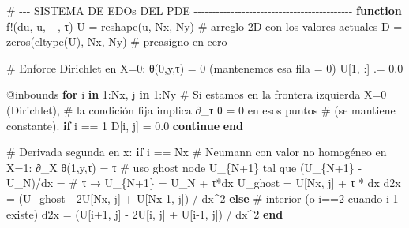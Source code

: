 \documentclass[
  spanish,
  us-letterpaper,
]{scrreprt}
\newenvironment{Shaded}{\begin{snugshade}}{\end{snugshade}}
\newcommand{\CommentTok}[1]{\textcolor[rgb]{0.37,0.37,0.37}{#1}}
\newcommand{\ControlFlowTok}[1]{\textcolor[rgb]{0.00,0.23,0.31}{\textbf{#1}}}
\newcommand{\FloatTok}[1]{\textcolor[rgb]{0.68,0.00,0.00}{#1}}
\newcommand{\FunctionTok}[1]{\textcolor[rgb]{0.28,0.35,0.67}{#1}}
\newcommand{\KeywordTok}[1]{\textcolor[rgb]{0.00,0.23,0.31}{\textbf{#1}}}
\newcommand{\NormalTok}[1]{\textcolor[rgb]{0.00,0.23,0.31}{#1}}
\newcommand{\OperatorTok}[1]{\textcolor[rgb]{0.37,0.37,0.37}{#1}}
\newcommand{\PreprocessorTok}[1]{\textcolor[rgb]{0.68,0.00,0.00}{#1}}
\theoremstyle{definition}
\theoremstyle{plain}
\theoremstyle{remark}
\begin{document}
\begin{Shaded}
\begin{Highlighting}[]
\CommentTok{\# {-}{-}{-} SISTEMA DE EDOs DEL PDE {-}{-}{-}{-}{-}{-}{-}{-}{-}{-}{-}{-}{-}{-}{-}{-}{-}{-}{-}{-}{-}{-}{-}{-}{-}{-}{-}{-}{-}{-}{-}{-}{-}{-}{-}{-}{-}{-}{-}{-}{-}{-}{-}}
\KeywordTok{function} \FunctionTok{f!}\NormalTok{(du, u, \_, τ)}
\NormalTok{    U }\OperatorTok{=} \FunctionTok{reshape}\NormalTok{(u, Nx, Ny)          }\CommentTok{\# arreglo 2D con los valores actuales}
\NormalTok{    D }\OperatorTok{=} \FunctionTok{zeros}\NormalTok{(}\FunctionTok{eltype}\NormalTok{(U), Nx, Ny)    }\CommentTok{\# preasigno en cero}

    \CommentTok{\# Enforce Dirichlet en X=0: θ(0,y,τ) = 0 (mantenemos esa fila = 0)}
\NormalTok{    U[}\FloatTok{1}\NormalTok{, }\OperatorTok{:}\NormalTok{] }\OperatorTok{.=} \FloatTok{0.0}

    \PreprocessorTok{@inbounds} \ControlFlowTok{for}\NormalTok{ i }\KeywordTok{in} \FloatTok{1}\OperatorTok{:}\NormalTok{Nx, j }\KeywordTok{in} \FloatTok{1}\OperatorTok{:}\NormalTok{Ny}
        \CommentTok{\# Si estamos en la frontera izquierda X=0 (Dirichlet), }
        \CommentTok{\# la condición fija implica ∂\_τ θ = 0 en esos puntos}
        \CommentTok{\# (se mantiene constante).}
        \ControlFlowTok{if}\NormalTok{ i }\OperatorTok{==} \FloatTok{1}
\NormalTok{            D[i, j] }\OperatorTok{=} \FloatTok{0.0}
            \ControlFlowTok{continue}
        \ControlFlowTok{end}

        \CommentTok{\# Derivada segunda en x:}
        \ControlFlowTok{if}\NormalTok{ i }\OperatorTok{==}\NormalTok{ Nx}
            \CommentTok{\# Neumann con valor no homogéneo en X=1: ∂\_X θ(1,y,τ) = τ}
            \CommentTok{\# uso ghost node U\_\{N+1\} tal que (U\_\{N+1\} {-} U\_N)/dx = }
            \CommentTok{\# τ → U\_\{N+1\} = U\_N + τ*dx}
\NormalTok{            U\_ghost }\OperatorTok{=}\NormalTok{ U[Nx, j] }\OperatorTok{+}\NormalTok{ τ }\OperatorTok{*}\NormalTok{ dx}
\NormalTok{            d2x }\OperatorTok{=}\NormalTok{ (U\_ghost }\OperatorTok{{-}} \FloatTok{2}\NormalTok{U[Nx, j] }\OperatorTok{+}\NormalTok{ U[Nx}\OperatorTok{{-}}\FloatTok{1}\NormalTok{, j]) }\OperatorTok{/}\NormalTok{ dx}\OperatorTok{\^{}}\FloatTok{2}
        \ControlFlowTok{else}
            \CommentTok{\# interior (o i==2 cuando i{-}1 existe)}
\NormalTok{            d2x }\OperatorTok{=}\NormalTok{ (U[i}\OperatorTok{+}\FloatTok{1}\NormalTok{, j] }\OperatorTok{{-}} \FloatTok{2}\NormalTok{U[i, j] }\OperatorTok{+}\NormalTok{ U[i}\OperatorTok{{-}}\FloatTok{1}\NormalTok{, j]) }\OperatorTok{/}\NormalTok{ dx}\OperatorTok{\^{}}\FloatTok{2}
        \ControlFlowTok{end}


\end{Highlighting}
\end{Shaded}
\end{document}
